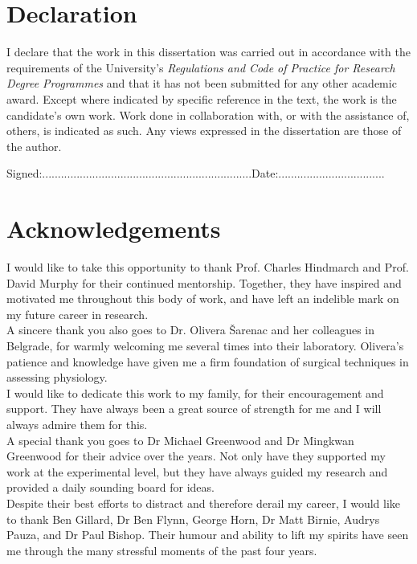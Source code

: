 \documentclass[12pt]{report}
\begin{document}
\chapter*{Declaration}
I declare that the work in this dissertation was carried out in accordance with the requirements of the University's \textit{Regulations and Code of Practice for Research Degree Programmes} and that it has not been submitted for any other academic award.
Except where indicated by specific reference in the text, the work is the candidate's own work. Work done in collaboration with, or with the assistance of, others, is indicated as such. Any views expressed in the dissertation are those of the author.

\vspace{10cm}
\noindent
Signed:...................................................................Date:..................................

%
\chapter*{Acknowledgements}
I would like to take this opportunity to thank Prof. Charles Hindmarch and Prof. David Murphy for their continued mentorship. Together, they have inspired and motivated me throughout this body of work, and have left an indelible mark on my future career in research. \\

A sincere thank you also goes to Dr. Olivera Šarenac and her colleagues in Belgrade, for warmly welcoming me several times into their laboratory. Olivera's patience and knowledge have given me a firm foundation of surgical techniques in assessing physiology.\\

I would like to dedicate this work to my family, for their encouragement and support. They have always been a great source of strength for me and I will always admire them for this. \\

A special thank you goes to Dr Michael Greenwood and Dr Mingkwan Greenwood for their advice over the years. Not only have they supported my work at the experimental level, but they have always guided my research and provided a daily sounding board for ideas. \\

Despite their best efforts to distract and therefore derail my career, I would like to thank Ben Gillard, Dr Ben Flynn, George Horn, Dr Matt Birnie, Audrys Pauza, and Dr Paul Bishop. Their humour and ability to lift my spirits have seen me through the many stressful moments of the past four years. \\
\end{document}
